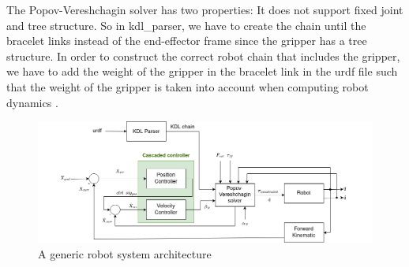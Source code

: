 \documentclass[report.tex]{subfiles}
\begin{document}
    The Popov-Vereshchagin solver has two properties: It does not support fixed joint and tree structure. So in kdl\_parser, we have to create the chain until the bracelet links instead of the end-effector frame since the gripper has a tree structure. In order to construct the correct robot chain that includes the gripper, we have to add the weight of the gripper in the bracelet link in the urdf file such that the weight of the gripper is taken into account when computing robot dynamics \cite{gripper}.    \begin{figure}[h]
        \centering
        \includegraphics[width=1\linewidth]{images/system_arch.png}
        \caption{A generic robot system architecture}
        \label{fig:sys}
    \end{figure}
\end{document}
